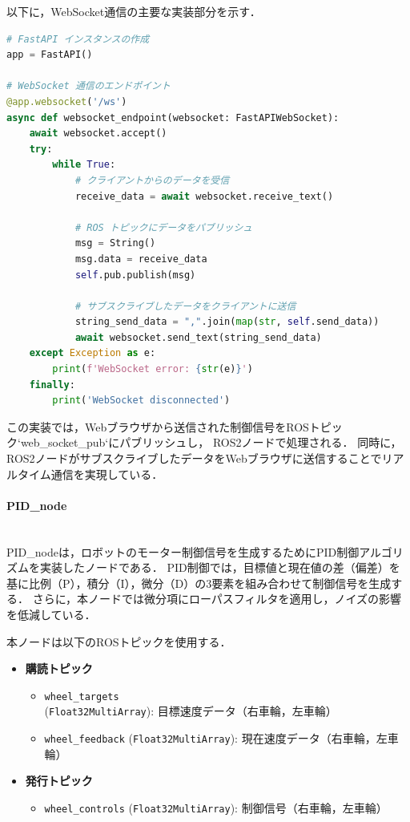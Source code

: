 以下に，WebSocket通信の主要な実装部分を示す．

\begin{lstlisting}[language=Python, caption=WebSocket通信の主要部分 (web\_socket\_node.py)]
# FastAPI インスタンスの作成
app = FastAPI()

# WebSocket 通信のエンドポイント
@app.websocket('/ws')
async def websocket_endpoint(websocket: FastAPIWebSocket):
    await websocket.accept()
    try:
        while True:
            # クライアントからのデータを受信
            receive_data = await websocket.receive_text()
            
            # ROS トピックにデータをパブリッシュ
            msg = String()
            msg.data = receive_data
            self.pub.publish(msg)

            # サブスクライブしたデータをクライアントに送信
            string_send_data = ",".join(map(str, self.send_data))
            await websocket.send_text(string_send_data)
    except Exception as e:
        print(f'WebSocket error: {str(e)}')
    finally:
        print('WebSocket disconnected')
\end{lstlisting}

この実装では，Webブラウザから送信された制御信号をROSトピック`web\_socket\_pub`にパブリッシュし，
ROS2ノードで処理される．
同時に，ROS2ノードがサブスクライブしたデータをWebブラウザに送信することでリアルタイム通信を実現している．


\paragraph{PID\_node}\mbox{}\\
PID\_nodeは，ロボットのモーター制御信号を生成するためにPID制御アルゴリズムを実装したノードである．
PID制御では，目標値と現在値の差（偏差）を基に比例（P），積分（I），微分（D）の3要素を組み合わせて制御信号を生成する．
さらに，本ノードでは微分項にローパスフィルタを適用し，ノイズの影響を低減している．

本ノードは以下のROSトピックを使用する．
\begin{itemize}
    \item \textbf{購読トピック}
          \begin{itemize}
              \item \texttt{wheel\_targets} (\texttt{Float32MultiArray}): 目標速度データ（右車輪，左車輪）
              \item \texttt{wheel\_feedback} (\texttt{Float32MultiArray}): 現在速度データ（右車輪，左車輪）
          \end{itemize}
    \item \textbf{発行トピック}
          \begin{itemize}
              \item \texttt{wheel\_controls} (\texttt{Float32MultiArray}): 制御信号（右車輪，左車輪）
          \end{itemize}
\end{itemize}

